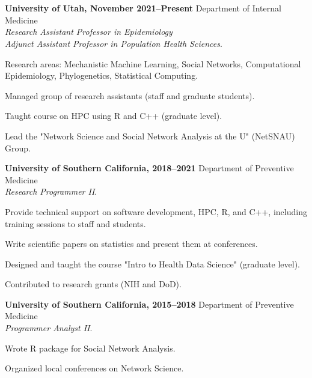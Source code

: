 \documentclass[letterpaper, 9pt]{article}
\newcommand{\myorange}{myteal!70!black}
\newcommand{\darkorange}{\myorange !50!black}
\renewcommand{\textbf}[1]{{\bfseries\color{\myorange}#1}}
\renewenvironment{itemize}{
  \begin{list}{}{
    \setlength{\leftmargin}{0.3cm}
  }
}{
  \end{list}
}
\begin{document}
\vspace{-.5cm}
\section*{\color{\darkorange}{Professional Experience}}
\vspace{-.25cm}

\begin{itemize}
\item \textbf{University of Utah, November 2021--Present} Department of Internal Medicine\\
\emph{Research Assistant Professor in Epidemiology}\\
\emph{Adjunct Assistant Professor in Population Health Sciences}. 
\begin{itemize}
	\item[-] Research areas: Mechanistic Machine Learning, Social Networks, Computational Epidemiology, Phylogenetics, Statistical Computing.
	\item[-] Managed group of research assistants (staff and graduate students).
	\item[-] Taught course on HPC using R and C++ (graduate level).
	\item[-] Lead the "Network Science and Social Network Analysis at the U" (NetSNAU) Group.
\end{itemize}
\item \textbf{University of Southern California, 2018--2021} Department of Preventive Medicine\\\emph{Research Programmer II}.
\begin{itemize}
	\item[-] Provide technical support on software development, HPC, R, and C++, including training sessions to staff and students.
	\item[-] Write scientific papers on statistics and present them at conferences.
	\item[-] Designed and taught the course "Intro to Health Data Science" (graduate level).
	\item[-] Contributed to research grants (NIH and DoD).
\end{itemize}
\item \textbf{University of Southern California, 2015--2018} Department of Preventive Medicine\\\emph{Programmer Analyst II}. 
\begin{itemize}
	\item[-] Wrote R package for Social Network Analysis.
	\item[-] Organized local conferences on Network Science.

\end{itemize}
\end{itemize}
\end{document}
